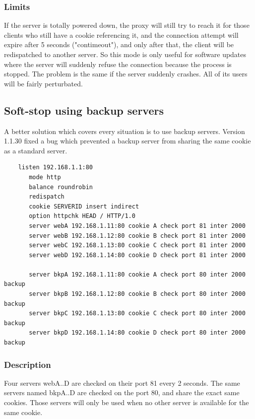 \subsubsection{Limits}

If the server is totally powered down, the proxy will still try to reach it
for those clients who still have a cookie referencing it, and the connection
attempt will expire after 5 seconds ("contimeout"), and only after that, the
client will be redispatched to another server. So this mode is only useful
for software updates where the server will suddenly refuse the connection
because the process is stopped. The problem is the same if the server suddenly
crashes. All of its users will be fairly perturbated.

\subsection{Soft-stop using backup servers}

A better solution which covers every situation is to use backup servers.
Version 1.1.30 fixed a bug which prevented a backup server from sharing
the same cookie as a standard server.

\begin{verbatim}
    listen 192.168.1.1:80
       mode http
       balance roundrobin
       redispatch
       cookie SERVERID insert indirect
       option httpchk HEAD / HTTP/1.0
       server webA 192.168.1.11:80 cookie A check port 81 inter 2000
       server webB 192.168.1.12:80 cookie B check port 81 inter 2000
       server webC 192.168.1.13:80 cookie C check port 81 inter 2000
       server webD 192.168.1.14:80 cookie D check port 81 inter 2000

       server bkpA 192.168.1.11:80 cookie A check port 80 inter 2000 backup
       server bkpB 192.168.1.12:80 cookie B check port 80 inter 2000 backup
       server bkpC 192.168.1.13:80 cookie C check port 80 inter 2000 backup
       server bkpD 192.168.1.14:80 cookie D check port 80 inter 2000 backup
\end{verbatim}

\subsubsection{Description}

Four servers webA..D are checked on their port 81 every 2 seconds. The same
servers named bkpA..D are checked on the port 80, and share the exact same
cookies. Those servers will only be used when no other server is available
for the same cookie.

